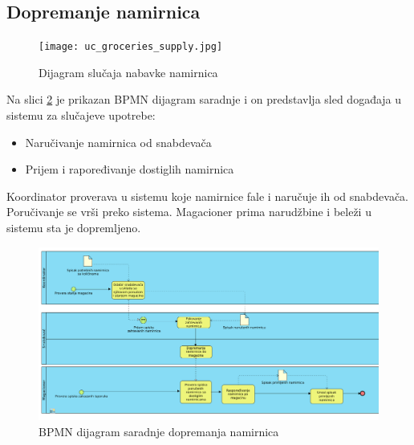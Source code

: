 \subsection{Dopremanje namirnica}
\begin{figure}[H]
\begin{center}
\texttt{[image: uc\_groceries\_supply.jpg]}

    \caption{Dijagram slučaja nabavke namirnica}
    \end{center}
\label{fig:Uc_diagram_groceries_supply}
\end{figure}

Na slici \ref{fig:bpmnGroceryDelivery} je prikazan BPMN dijagram saradnje i on predstavlja sled događaja u sistemu za slučajeve upotrebe: 
\begin{itemize}
	\item{Naručivanje namirnica od snabdevača}
	\item{Prijem i rapoređivanje dostiglih namirnica}
\end{itemize}

Koordinator proverava u sistemu koje namirnice fale i naručuje ih od snabdevača.
Poručivanje se vrši preko sistema. Magacioner prima narudžbine i beleži u sistemu sta je dopremljeno.


\begin{figure}[H]
	\begin{center}
		\includegraphics[width=\textwidth]{Pictures/bpmn_grocery_delivery.png}
	\end{center}
    \caption{BPMN dijagram saradnje dopremanja namirnica}
\label{fig:bpmnGroceryDelivery}
\end{figure}





